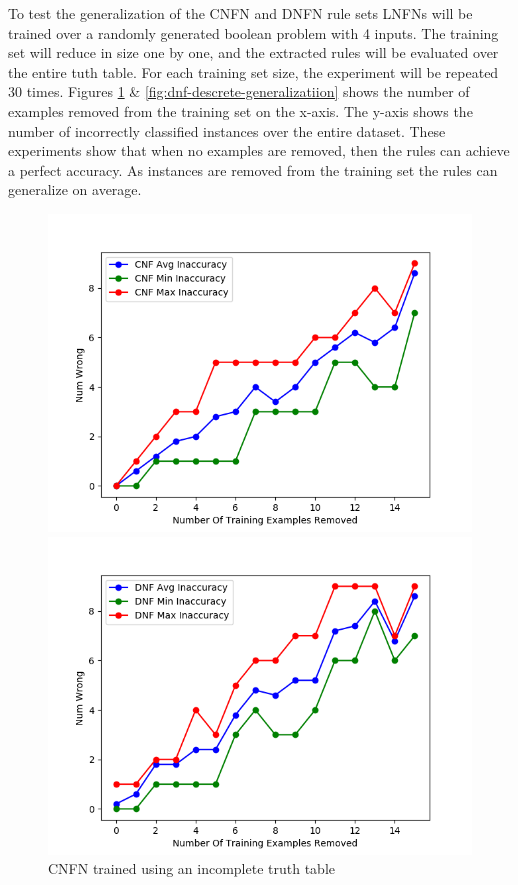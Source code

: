 To test the generalization of the CNFN and DNFN rule sets LNFNs will be trained over a randomly generated boolean problem with 4 inputs. The training set will reduce in size one by one, and the extracted rules will be evaluated over the entire tuth table. For each training set size, the experiment will be repeated 30 times. Figures \ref{fig:cnf-descrete-generalizatiion} \& \ref{fig:dnf-descrete-generalizatiion} shows the number of examples removed from the training set on the x-axis. The y-axis shows the number of incorrectly classified instances over the entire dataset. These experiments show that when no examples are removed, then the rules can achieve a perfect accuracy. As instances are removed from the training set the rules can generalize on average. 

\begin{figure}[H]
	\centering
	\begin{minipage}[b]{0.45\textwidth}
		\includegraphics[width=\textwidth]{cnf-descrete-generalization.png}
		\caption{CNFN trained using an incomplete truth table}
		\label{fig:cnf-descrete-generalizatiion}
	\end{minipage}
	\begin{minipage}[b]{0.45\textwidth}
		\includegraphics[width=\textwidth]{dnf-descrete-generalization.png}

\end{minipage}
\end{figure}
